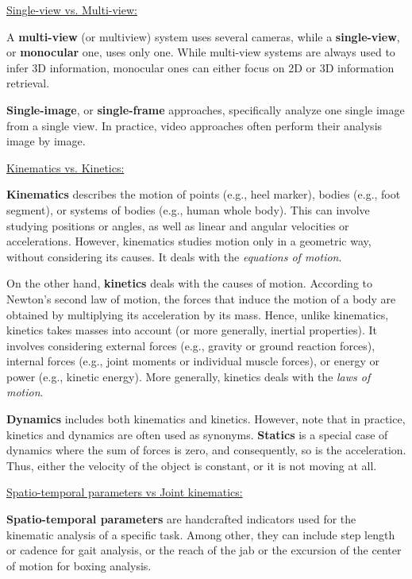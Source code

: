 \vspace*{0.5cm}

\noindent\underline{Single-view vs. Multi-view:}

A \textbf{multi-view} (or multiview) system uses several cameras, while a \textbf{single-view}, or \textbf{monocular} one, uses only one. While multi-view systems are always used to infer 3D information, monocular ones can either focus on 2D or 3D information retrieval.

\textbf{Single-image}, or \textbf{single-frame} approaches, specifically analyze one single image from a single view. In practice, video approaches often perform their analysis image by image.

\vspace*{0.5cm}

\noindent\underline{Kinematics vs. Kinetics: }

\textbf{Kinematics} describes the motion of points (e.g., heel marker), bodies (e.g., foot segment), or systems of bodies (e.g., human whole body). This can involve studying positions or angles, as well as linear and angular velocities or accelerations. However, kinematics studies motion only in a geometric way, without considering its causes. It deals with the \emph{equations of motion}.

On the other hand, \textbf{kinetics} deals with the causes of motion. According to Newton's second law of motion, the forces that induce the motion of a body are obtained by multiplying its acceleration by its mass. Hence, unlike kinematics, kinetics takes masses into account (or more generally, inertial properties). It involves considering external forces (e.g., gravity or ground reaction forces), internal forces (e.g., joint moments or individual muscle forces), or energy or power (e.g., kinetic energy). More generally, kinetics deals with the \emph{laws of motion}.

\textbf{Dynamics} includes both kinematics and kinetics. However, note that in practice, kinetics and dynamics are often used as synonyms. \textbf{Statics} is a special case of dynamics where the sum of forces is zero, and consequently, so is the acceleration. Thus, either the velocity of the object is constant, or it is not moving at all. 

\vspace*{0.5cm}

\noindent\underline{Spatio-temporal parameters vs Joint kinematics:}

\textbf{Spatio-temporal parameters} are handcrafted indicators used for the kinematic analysis of a specific task. Among other, they can include step length or cadence for gait analysis, or the reach of the jab or the excursion of the center of motion for boxing analysis.

